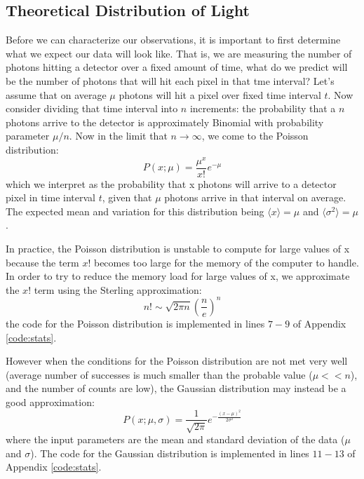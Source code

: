 \documentclass[preprint]{aastex62}
\begin{document}
\subsection{Theoretical Distribution of Light} \label{subsec:distributions}
Before we can characterize our observations, it is important to first determine what we expect our data will look like. That is, we are measuring the number of photons hitting a detector over a fixed amount of time, what do we predict will be the number of photons that will hit each pixel in that tme interval? Let's assume that on average $\mu$ photons will hit a pixel over fixed time interval $t$. Now consider dividing that time interval into $n$ increments: the probability that a $n$ photons arrive to the detector is approximately Binomial with probability parameter $\mu/n$. Now in the limit that $n\rightarrow\infty$, we come to the Poisson distribution:
\begin{equation}
P(x;\mu) = \frac{\mu^x}{x!}e^{-\mu}
\end{equation}
which we interpret as the probability that x photons will arrive to a detector pixel in time interval $t$, given that $\mu$ photons arrive in that interval on average. The expected mean and variation for this distribution being $\langle x \rangle = \mu$ and $\langle \sigma^2 \rangle = \mu$. 

In practice, the Poisson distribution is unstable to compute for large values of x because the term $x!$ becomes too large for the memory of the computer to handle. In order to try to reduce the memory load for large values of x, we approximate the $x!$ term using the Sterling approximation:
\begin{equation}
n! \sim \sqrt{2\pi n}\left(\frac{n}{e} \right)^n
\end{equation}
the code for the Poisson distribution is implemented in lines $7-9$ of Appendix \ref{code:stats}.

However when the conditions for the Poisson distribution are not met very well (average number of successes is much smaller than the probable value ($\mu << n$), and the number of counts are low), the Gaussian distribution may instead be a good approximation:
\begin{equation}
P(x; \mu, \sigma) = \frac{1}{\sqrt{2\pi}} e^{-\frac{(x-\mu)^2}{2\sigma^2}}
\end{equation}
where the input parameters are the mean and standard deviation of the data ($\mu$ and $\sigma$). The code for the Gaussian distribution is implemented in lines $11-13$ of Appendix \ref{code:stats}. 
\end{document}
